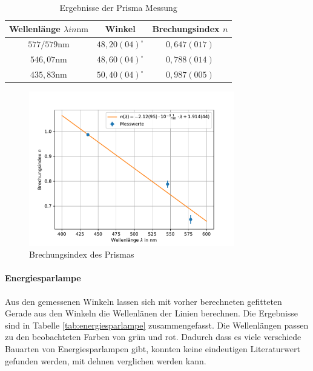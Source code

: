\documentclass[11pt, a4paper]{article}
\begin{document}


    \begin{table}[h]
        \centering
        \begin{tabular}{c|c|c}
            Wellenlänge $\lambda in \si{\nano\metre}$ \cite{Wiki} & Winkel & Brechungsindex $n$ \\ \hline
            $577/579 \si{\nano\meter}$ & $48,20(04)^{\circ}$ & $0,647(017)$ \\ \hline
            $546,07 \si{\nano\meter}$ & $48,60(04)^{\circ}$ & $0,788(014)$ \\ \hline
            $435,83 \si{\nano\meter}$ & $50,40(04)^{\circ}$ & $0,987(005)$ \\ \hline
        \end{tabular}
        \caption{Ergebnisse der Prisma Messung}
        \label{tab:prisma}     
    \end{table}

    \begin{figure}
        \centering
        \includegraphics[width=0.8\textwidth]{plots/prism1.pdf}
        \caption{Brechungsindex des Prismas}
        \label{fig:prisma}
    \end{figure}

    \paragraph{Energiesparlampe}
    Aus den gemessenen Winkeln lassen sich mit vorher berechneten gefitteten Gerade aus den Winkeln die Wellenlänen der Linien berechnen. Die Ergebnisse sind in Tabelle \ref{tab:energiesparlampe} zusammengefasst. Die Wellenlängen passen zu den beobachteten Farben von grün und rot. Dadurch dass es viele verschiede Bauarten von Energiesparlampen gibt, konnten keine eindeutigen Literaturwert gefunden werden, mit dehnen verglichen werden kann.
\end{document}
